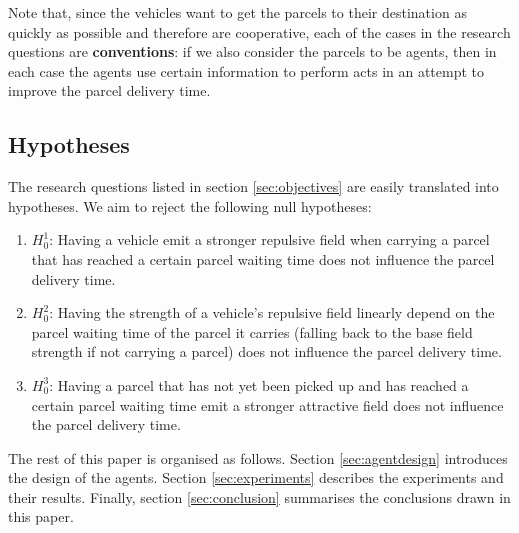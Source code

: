 Note that, since the vehicles want to get the parcels to their destination as quickly as possible and therefore are cooperative, each of the cases in the research questions are \textbf{conventions}: if we also consider the parcels to be agents, then in each case the agents use certain information to perform acts in an attempt to improve the parcel delivery time.

\subsection{Hypotheses}\label{sec:hypotheses}
The research questions listed in section \ref{sec:objectives} are easily translated into hypotheses. We aim to reject the following null hypotheses:
\begin{enumerate}
\item $H^1_0$: Having a vehicle emit a stronger repulsive field when carrying a parcel that has reached a certain parcel waiting time does not influence the parcel delivery time.
\item $H^2_0$: Having the strength of a vehicle's repulsive field linearly depend on the parcel waiting time of the parcel it carries (falling back to the base field strength if not carrying a parcel) does not influence the parcel delivery time.
\item $H^3_0$: Having a parcel that has not yet been picked up and has reached a certain parcel waiting time emit a stronger attractive field does not influence the parcel delivery time.
\end{enumerate}

The rest of this paper is organised as follows. Section \ref{sec:agentdesign} introduces the design of the agents. Section \ref{sec:experiments} describes the experiments and their results. Finally, section \ref{sec:conclusion} summarises the conclusions drawn in this paper.